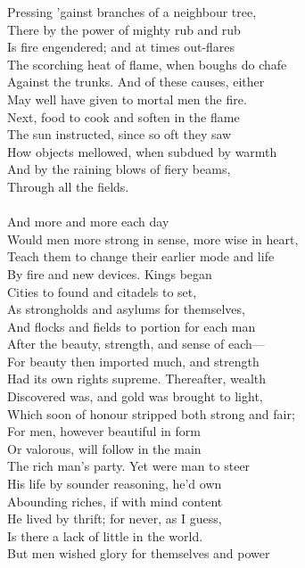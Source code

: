 Pressing 'gainst branches of a neighbour tree,\\
There by the power of mighty rub and rub\\
Is fire engendered; and at times out-flares\\
The scorching heat of flame, when boughs do chafe\\
Against the trunks. And of these causes, either\\
May well have given to mortal men the fire.\\
Next, food to cook and soften in the flame\\
The sun instructed, since so oft they saw\\
How objects mellowed, when subdued by warmth\\
And by the raining blows of fiery beams,\\
Through all the fields.\\
\\
And more and more each day\\
Would men more strong in sense, more wise in heart,\\
Teach them to change their earlier mode and life\\
By fire and new devices. Kings began\\
Cities to found and citadels to set,\\
As strongholds and asylums for themselves,\\
And flocks and fields to portion for each man\\
After the beauty, strength, and sense of each—\\
For beauty then imported much, and strength\\
Had its own rights supreme. Thereafter, wealth\\
Discovered was, and gold was brought to light,\\
Which soon of honour stripped both strong and fair;\\
For men, however beautiful in form\\
Or valorous, will follow in the main\\
The rich man's party. Yet were man to steer\\
His life by sounder reasoning, he'd own\\
Abounding riches, if with mind content\\
He lived by thrift; for never, as I guess,\\
Is there a lack of little in the world.\\
But men wished glory for themselves and power\\
